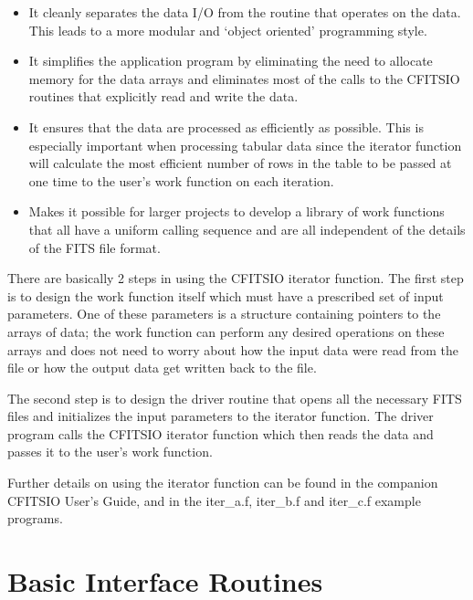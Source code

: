 \documentclass[11pt]{book}
\begin{document}
\begin{itemize}
\item
It cleanly separates the data I/O from the routine that operates on
the data.  This leads to a more modular and `object oriented'
programming style.

\item
It simplifies the application program by eliminating the need to allocate
memory for the data arrays and eliminates most of the calls to the CFITSIO
routines that explicitly read and write the data.

\item
It ensures that the data are processed as efficiently as possible.
This is especially important when processing tabular data since
the iterator function will calculate the most efficient number
of rows in the table to be passed at one time to the user's work
function on each iteration.

\item
Makes it possible for larger projects to develop a library of work
functions that all have a uniform calling sequence and are all
independent of the details of the FITS file format.

\end{itemize}

There are basically 2 steps in using the CFITSIO iterator function.
The first step is to design the work function itself which must have a
prescribed set of input parameters.  One of these parameters is a
structure containing pointers to the arrays of data; the work function
can perform any desired operations on these arrays and does not need to
worry about how the input data were read from the file or how the
output data get written back to the file.

The second step is to design the driver routine that opens all the
necessary FITS files and initializes  the input parameters to the
iterator function.  The driver program calls the CFITSIO iterator
function which then reads the data and passes it to the user's work
function.

Further details on using the iterator function can be found in the
companion CFITSIO User's Guide, and in the iter\_a.f, iter\_b.f and
iter\_c.f example programs.



\chapter{  Basic Interface Routines }
\end{document}
